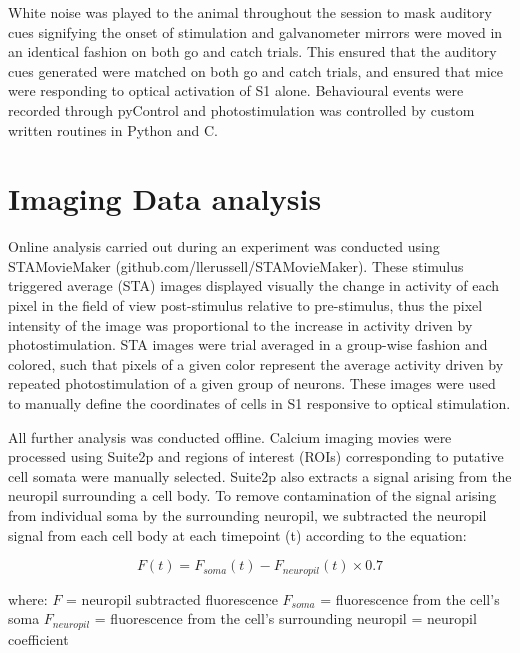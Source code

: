 White noise was played to the animal throughout the session to mask auditory cues signifying the onset of stimulation and galvanometer mirrors were moved in an identical fashion on both go and catch trials. This ensured that the auditory cues generated were matched on both go and catch trials, and ensured that mice were responding to optical activation of S1 alone. Behavioural events were recorded through pyControl and photostimulation was controlled by custom written routines in Python and C.


\section{Imaging Data analysis}

Online analysis carried out during an experiment was conducted using STAMovieMaker (github.com/llerussell/STAMovieMaker). These stimulus triggered average (STA) images displayed visually the change in activity of each pixel in the field of view post-stimulus relative to pre-stimulus, thus the pixel intensity of the image was proportional to the increase in activity driven by photostimulation. STA images were trial averaged in a group-wise fashion and colored, such that pixels of a given color represent the average activity driven by repeated photostimulation of a given group of neurons. These images were used to manually define the coordinates of cells in S1 responsive to optical stimulation.

All further analysis was conducted offline. Calcium imaging movies were processed using Suite2p \cite{pachitariu_suite2p_2016} and regions of interest (ROIs) corresponding to putative cell somata were manually selected. Suite2p also extracts a signal arising from the neuropil surrounding a cell body. To remove contamination of the signal arising from individual soma by the surrounding neuropil, we subtracted the neuropil signal from each cell body at each timepoint (t) according to the equation:

\begin{equation} \label{eq:neuropil_sub}
F(t) = F_{soma}(t) - F_{neuropil}(t) \times 0.7
\end{equation}

where: \newline
$F$ = neuropil subtracted fluorescence \newline
$F_{soma}$ = fluorescence from the cell's soma \newline
$F_{neuropil}$ = fluorescence from the cell's surrounding neuropil  = neuropil coefficient \cite{chen_ultrasensitive_2013} \newline

